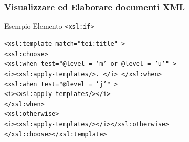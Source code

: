     

    

\begin{frame}
    \frametitle{Visualizzare ed Elaborare documenti XML}
    \addtocounter{nframe}{1}
    

     \begin{block}{Esempio Elemento \texttt{<xsl:if>}}
        
        \texttt{<xsl:template match="tei:title" >}
        \\\texttt{<xsl:choose>}
        \\\texttt{<xsl:when test="@level = 'm' or @level = 'u'" >}
        \\\texttt{<i><xsl:apply-templates/>. </i> </xsl:when>}
        \\\texttt{<xsl:when test="@level = 'j'" >}
        \\\texttt{<i><xsl:apply-templates/></i>}
        \\\texttt{</xsl:when>}
        \\\texttt{<xsl:otherwise>}
        \\\texttt{<i><xsl:apply-templates/></i></xsl:otherwise>}
        \\\texttt{</xsl:choose></xsl:template>}
     \end{block}

\end{frame}


